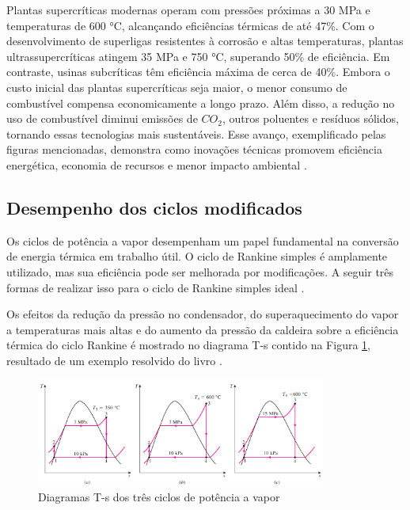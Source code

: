 \documentclass[
	article,			%
	11pt,				%
	oneside,			%
	a4paper,			%
	english,			%
	brazil,				%
	sumario=tradicional
	]{abntex2}
\begin{document}
Plantas supercríticas modernas operam com pressões próximas a 30 MPa e temperaturas de 600 °C, alcançando eficiências térmicas de até 47\%. Com o desenvolvimento de superligas resistentes à corrosão e altas temperaturas, plantas ultrassupercríticas atingem 35 MPa e 750 °C, superando 50\% de eficiência. Em contraste, usinas subcríticas têm eficiência máxima de cerca de 40\%. Embora o custo inicial das plantas supercríticas seja maior, o menor consumo de combustível compensa economicamente a longo prazo. Além disso, a redução no uso de combustível diminui emissões de $CO_2$, outros poluentes e resíduos sólidos, tornando essas tecnologias mais sustentáveis. Esse avanço, exemplificado pelas figuras mencionadas, demonstra como inovações técnicas promovem eficiência energética, economia de recursos e menor impacto ambiental \cite{moran-2018}.

\subsection{Desempenho dos ciclos modificados}

Os ciclos de potência a vapor desempenham um papel fundamental na conversão de energia térmica em trabalho útil. O ciclo de Rankine simples é amplamente utilizado, mas sua eficiência pode ser melhorada por modificações. A seguir três formas de realizar isso para o ciclo de Rankine simples ideal \cite{cengel-2008}.


Os efeitos da redução da pressão no condensador, do superaquecimento do vapor a temperaturas mais altas e do aumento da pressão da caldeira sobre a eficiência térmica do ciclo Rankine é mostrado no diagrama T-s contido na Figura \ref{fig:diagramas-ts-3-ciclos}, resultado de um exemplo resolvido do livro \cite{cengel-2008}.

\begin{figure}[h]
	\centering
	\includegraphics[width=0.85\textwidth]{./images/diagramas-ts-3-ciclos.png}
	\caption{Diagramas T-s dos três ciclos de potência a vapor}
	\label{fig:diagramas-ts-3-ciclos}
\end{figure}
\end{document}
